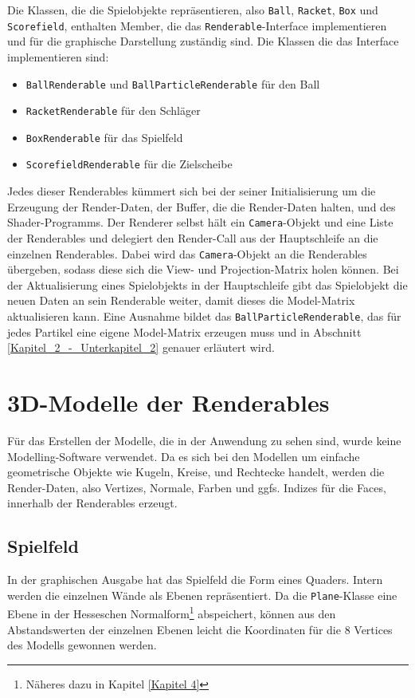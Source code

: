 Die Klassen, die die Spielobjekte repräsentieren, also {\texttt{Ball}}, {\texttt{Racket}}, {\texttt{Box}} und {\texttt{Scorefield}}, enthalten Member, die das {\texttt{Renderable}}-Interface implementieren und für die graphische Darstellung zuständig sind. Die Klassen die das Interface implementieren sind:

\begin{itemize}
	\setlength\itemsep{0.05em}
	\item {\texttt{BallRenderable}} und {\texttt{BallParticleRenderable}} für den Ball
	\item {\texttt{RacketRenderable}} für den Schläger
	\item {\texttt{BoxRenderable}} für das Spielfeld
	\item {\texttt{ScorefieldRenderable}} für die Zielscheibe 	
\end{itemize}

Jedes dieser Renderables kümmert sich bei der seiner Initialisierung um die Erzeugung der Render-Daten, der Buffer, die die Render-Daten halten, und des Shader-Programms. Der Renderer selbst hält ein {\texttt{Camera}}-Objekt und eine Liste der Renderables und delegiert den Render-Call aus der Hauptschleife an die einzelnen Renderables. Dabei wird das {\texttt{Camera}}-Objekt an die Renderables übergeben, sodass diese sich die View- und Projection-Matrix holen können. Bei der Aktualisierung eines Spielobjekts in der Hauptschleife gibt das Spielobjekt die neuen Daten an sein Renderable weiter, damit dieses die Model-Matrix aktualisieren kann. Eine Ausnahme bildet das {\texttt{BallParticleRenderable}}, das für jedes Partikel eine eigene Model-Matrix erzeugen muss und in Abschnitt \ref{Kapitel_2_-_Unterkapitel_2} genauer erläutert wird.

\section{3D-Modelle der Renderables}
%
Für das Erstellen der Modelle, die in der Anwendung zu sehen sind, wurde keine Modelling-Software verwendet. Da es sich bei den Modellen um einfache geometrische Objekte wie Kugeln, Kreise, und Rechtecke handelt, werden die Render-Daten, also Vertizes, Normale, Farben und ggfs. Indizes für die Faces, innerhalb der Renderables erzeugt.

\subsection{Spielfeld}
%
In der graphischen Ausgabe hat das Spielfeld die Form eines Quaders. Intern werden die einzelnen Wände als Ebenen repräsentiert. Da die {\texttt{Plane}}-Klasse eine Ebene in der Hesseschen Normalform\footnote{Näheres dazu in Kapitel \ref{Kapitel 4}} abspeichert, können aus den Abstandswerten der einzelnen Ebenen leicht die Koordinaten für die 8 Vertices des Modells gewonnen werden.

